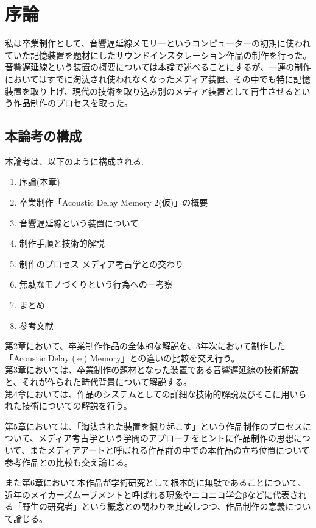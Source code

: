 \chapter{序論}\label{ux5e8fux8ad6}

私は卒業制作として、音響遅延線メモリーというコンピューターの初期に使われていた記憶装置を題材にしたサウンドインスタレーション作品の制作を行った。\\
音響遅延線という装置の概要については本論で述べることにするが、一連の制作においてはすでに淘汰され使われなくなったメディア装置、その中でも特に記憶装置を取り上げ、現代の技術を取り込み別のメディア装置として再生させるという作品制作のプロセスを取った。

\section{本論考の構成}\label{ux672cux8ad6ux8003ux306eux69cbux6210}

本論考は、以下のように構成される.

\begin{enumerate}
\def\labelenumi{\arabic{enumi}.}
\tightlist
\item
  序論(本章)
\item
  卒業制作「Acoustic Delay Memory 2(仮)」の概要
\item
  音響遅延線という装置について
\item
  制作手順と技術的解説
\item
  制作のプロセス メディア考古学との交わり
\item
  無駄なモノづくりという行為への一考察
\item
  まとめ
\item
  参考文献
\end{enumerate}

第2章において、卒業制作作品の全体的な解説を、3年次において制作した「Acoustic
Delay (⇔) Memory」との違いの比較を交え行う。\\
第3章においては、卒業制作の題材となった装置である音響遅延線の技術解説と、それが作られた時代背景について解説する。\\
第4章においては、作品のシステムとしての詳細な技術的解説及びそこに用いられた技術についての解説を行う。

第5章においては、「淘汰された装置を掘り起こす」という作品制作のプロセスについて、メディア考古学という学問のアプローチをヒントに作品制作の思想について、またメディアアートと呼ばれる作品群の中での本作品の立ち位置について参考作品との比較も交え論じる。

また第6章において本作品が学術研究として根本的に無駄であることについて、近年のメイカーズムーブメントと呼ばれる現象やニコニコ学会βなどに代表される「野生の研究者」という概念との関わりを比較しつつ、作品制作の意義について論じる。

